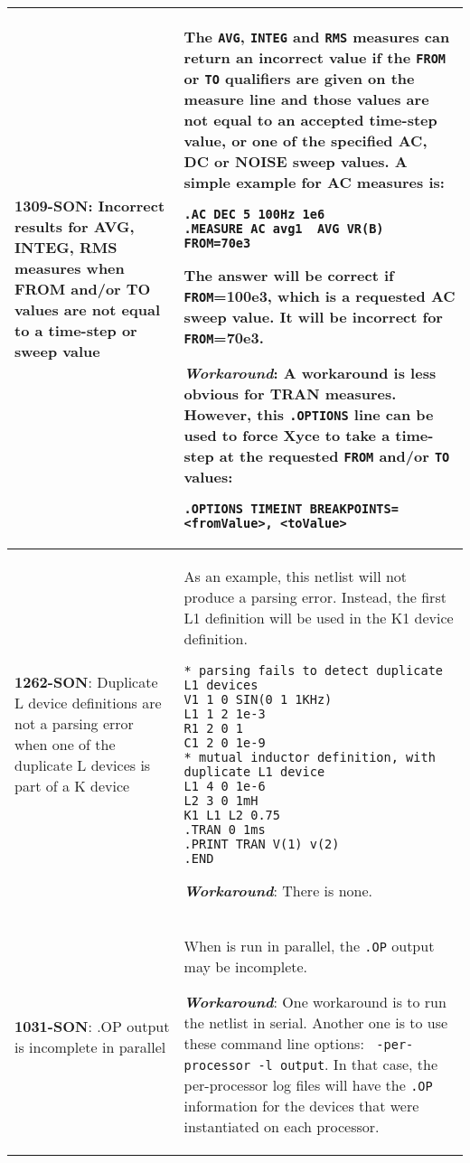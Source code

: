 {\begin{longtable}[h] {>{\raggedright\small}m{2in}|>{\raggedright\let\\\tabularnewline\small}m{3.5in}}
\textbf{1309-SON}: Incorrect results for AVG, INTEG, RMS measures when FROM
and/or TO values are not equal to a time-step or sweep value & The \texttt{AVG},
\texttt{INTEG} and \texttt{RMS} measures can return an incorrect value if
the \texttt{FROM} or \texttt{TO} qualifiers are given on the measure line
and those values are not equal to an accepted time-step value, or one of
the specified AC, DC or NOISE sweep values.  A simple example for AC measures
is:
\begin{verbatim}
.AC DEC 5 100Hz 1e6
.MEASURE AC avg1  AVG VR(B) FROM=70e3
\end{verbatim}
The answer will be correct if \texttt{FROM}=100e3, which is a requested
AC sweep value. It will be incorrect for \texttt{FROM}=70e3.

\textbf{\textit{Workaround}}:
A workaround is less obvious for TRAN measures.  However, this \texttt{.OPTIONS}
line can be used to force Xyce to take a time-step at the requested \texttt{FROM}
and/or \texttt{TO} values:
\begin{verbatim}
.OPTIONS TIMEINT BREAKPOINTS=<fromValue>, <toValue>
\end{verbatim}
\\ \hline

\textbf{1262-SON}: Duplicate L device definitions are not a parsing error
when one of the duplicate L devices is part of a K device &
As an example, this netlist will not produce a parsing error.  Instead,
the first L1 definition will be used in the K1 device definition.
\begin{verbatim}
* parsing fails to detect duplicate L1 devices
V1 1 0 SIN(0 1 1KHz)
L1 1 2 1e-3
R1 2 0 1
C1 2 0 1e-9
* mutual inductor definition, with duplicate L1 device
L1 4 0 1e-6
L2 3 0 1mH
K1 L1 L2 0.75
.TRAN 0 1ms
.PRINT TRAN V(1) v(2)
.END
\end{verbatim}

\textbf{\textit{Workaround}}:
There is none.
\\ \hline

\textbf{1031-SON}: .OP output is incomplete in parallel & When \Xyce{}
is run in parallel, the \texttt{.OP} output may be incomplete. 

\textbf{\textit{Workaround}}: One workaround is to run the netlist in 
serial.  Another one is to use these command line options: \texttt{
-per-processor -l output}.  In that case, the per-processor log files 
will have the \texttt{.OP} information for the devices that were 
instantiated on each processor.
\\ \hline 


\end{longtable}}
